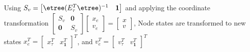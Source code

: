 \begin{frame}
					\begin{lemma}
					Using $S_v=\begin{bmatrix}
						\etree(E_{\tau}^T\etree)^{-1} & \mathbf{1}
					\end{bmatrix}$ and applying the coordinate transformation $\begin{bmatrix} S_v & \mathbf{0} \\ \mathbf{0} & S_v \end{bmatrix}\begin{bmatrix} x_e \\ v_e \end{bmatrix}=\begin{bmatrix} x \\ v \end{bmatrix}$, Node states are transformed to new states $x^T_e=\begin{bmatrix*} x^T_{\tau} & x^T_{\mathbf{1}}\end{bmatrix*}^T$, and $v^T_e=\begin{bmatrix*} v^T_{\tau} & v^T_{\mathbf{1}}\end{bmatrix*}^T$
					

\end{lemma}
\end{frame}
